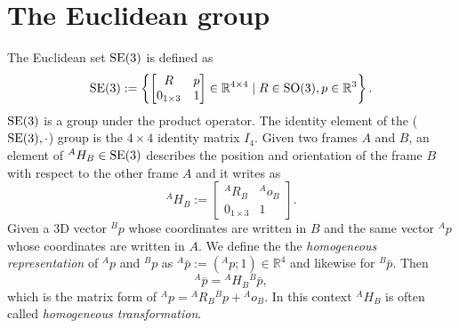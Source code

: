 \section{The Euclidean group\label{sec:se3}}

The Euclidean set ${\mathrm{SE}}(3)$ is defined as
\begin{equation}
{\mathrm{SE}}(3) :=  
\left\{ 
\begin{bmatrix} R & p \\ 0_{1\times3} & 1 \end{bmatrix} \in \mathbb{R}^{4 \times 4} \mid 
R \in \mathrm{SO}(3), p \in \mathbb{R}^3
\right\}.
\end{equation}
${\mathrm{SE}}(3)$ is a group under the product operator. The identity element of the (${\mathrm{SE}}(3), \cdot$) group is the $4 \times 4$ identity matrix $I_4$. Given two frames $A$ and $B$, an element of ${}^AH_B\in {\mathrm{SE}}(3)$ describes the position and orientation of the frame $B$ with respect to the other frame $A$ and it writes as
\begin{equation}
  \label{eq:homogeneousTransformation}
  {}^A H_B :=
     \begin{bmatrix}
     {}^A R_B & {}^A o_B \\
     0_{1\times3} & 1
  \end{bmatrix} .
\end{equation}
Given a 3D vector ${}^B p$ whose coordinates are written in $B$ and the same vector ${}^A p$ whose coordinates are written in $A$. We define the the \emph{homogeneous representation} of ${}^A p$ and ${}^B p$ as ${}^A \bar p := ({}^A p; 1) \in \mathbb{R}^4$ and likewise for
${}^B \bar p$. Then
\begin{equation} \label{eq:Abp_AHB_Bbp}
  {}^A \bar p = 
  {}^A H_B {}^B \bar p ,
\end{equation}
which is the matrix form of 
${}^A p = {}^A R_B {}^B p + {}^A o_B$.
In this context ${}^A H_B$ is often called \emph{homogeneous transformation}.

